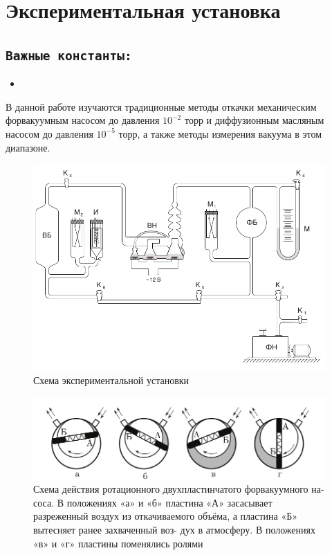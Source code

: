 \documentclass[11pt,a4paper]{article}
\begin{document}
\section*{Экспериментальная установка}
\subsection*{\texttt{Важные константы:}}
\begin{itemize}
  \item
\end{itemize}

В данной работе изучаются традиционные методы откачки
механическим форвакуумным насосом до давления
$10^{-2}$ торр и диффузионным
масляным насосом до давления $10^{-5}$ торр, а также методы измерения
вакуума в этом диапазоне.
\begin{figure}[h!]
  \includegraphics*[width=\textwidth]{ust.png}
  \caption{Схема экспериментальной установки}
  \label{fig:ust}
\end{figure}
\begin{figure}[h!]
  \includegraphics*[width=\textwidth]{ust2.png}
  \caption{Схема действия ротационного двухпластинчатого форвакуумного на-
    соса. В положениях «а» и «б» пластина «А» засасывает разреженный воздух
    из откачиваемого объёма, а пластина «Б» вытесняет ранее захваченный воз-
    дух в атмосферу. В положениях «в» и «г» пластины поменялись ролями}
  \label{fig:ust2}
\end{figure}
\end{document}

